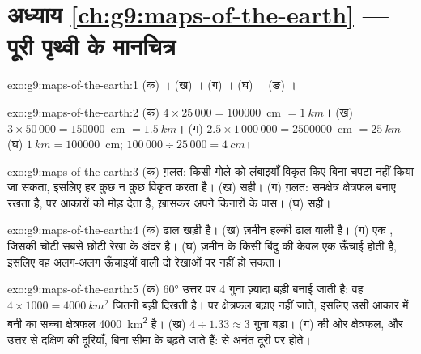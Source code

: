 \section*{अध्याय \ref{ch:g9:maps-of-the-earth} --- पूरी पृथ्वी के मानचित्र}

\begin{solution}{exo:g9:maps-of-the-earth:1}
(क) । (ख) । (ग) । (घ) । (ङ) ।
\end{solution}

\begin{solution}{exo:g9:maps-of-the-earth:2}
(क) $4 \times 25\,000 = \num{100000}$~cm $= \qty{1}{km}$। (ख) $3 \times
50\,000 = \num{150000}$~cm $= \qty{1.5}{km}$। (ग) $2.5 \times 1\,000\,000
= \num{2500000}$~cm $= \qty{25}{km}$। (घ) $\qty{1}{km} = \num{100000}$~cm;
$100\,000 \div 25\,000 = \qty{4}{cm}$।
\end{solution}

\begin{solution}{exo:g9:maps-of-the-earth:3}
(क) ग़लत: किसी गोले को लंबाइयाँ विकृत किए बिना चपटा नहीं किया जा सकता, इसलिए हर  कुछ न कुछ विकृत करता है। (ख) सही। (ग) ग़लत: समक्षेत्र  क्षेत्रफल बनाए रखता
है, पर आकारों को मोड़ देता है, ख़ासकर अपने किनारों के पास। (घ) सही।
\end{solution}

\begin{solution}{exo:g9:maps-of-the-earth:4}
(क) ढाल खड़ी है। (ख) ज़मीन हल्की ढाल वाली है। (ग) एक , जिसकी चोटी सबसे छोटी रेखा के
अंदर है। (घ) ज़मीन के किसी बिंदु की केवल एक ऊँचाई होती है, इसलिए वह अलग-अलग ऊँचाइयों वाली
दो रेखाओं पर नहीं हो सकता।
\end{solution}

\begin{solution}{exo:g9:maps-of-the-earth:5}
(क) \ang{60} उत्तर पर  4 गुना ज़्यादा बड़ी बनाई जाती है: वह
$4 \times 1000 = \qty{4000}{km^2}$ जितनी बड़ी दिखती है।  पर क्षेत्रफल बढ़ाए नहीं
जाते, इसलिए उसी आकार में बनी  का सच्चा क्षेत्रफल \qty{4000}{km^2} है।
(ख) $4 \div 1.33 \approx 3$ गुना बड़ा। (ग)  की ओर क्षेत्रफल, और उत्तर से दक्षिण की
दूरियाँ, बिना सीमा के बढ़ते जाते हैं:   से अनंत दूरी पर
होते।
\end{solution}

